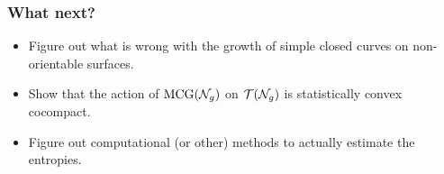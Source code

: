\begin{frame}
  \frametitle{What next?}
  \begin{itemize}
  \item<2-> Figure out what is wrong with the growth of simple closed curves on non-orientable surfaces.
  \item<3-> Show that the action of $\text{MCG}(\mathcal{N}_g)$ on $\mathcal{T}(\mathcal{N}_g)$ is statistically convex cocompact.
  \item<4-> Figure out computational (or other) methods to actually estimate the entropies.
  \end{itemize}
\end{frame}



